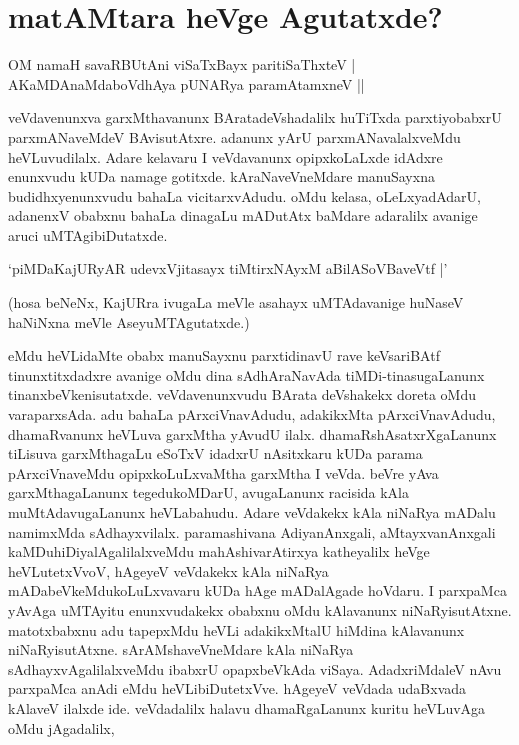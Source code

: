 \chapter{matAMtara heVge Agutatxde?}

\begin{shloka}
OM namaH savaRBUtAni viSaTxBayx paritiSaThxteV |\\
AKaMDAnaMdaboVdhAya pUNARya paramAtamxneV ||
\end{shloka}

veVdavenunxva garxMthavanunx BAratadeVshadalilx huTiTxda parxtiyobabxrU parxmANaveMdeV BAvisutAtxre. adanunx yArU parxmANavalalxveMdu heVLuvudilalx. Adare kelavaru I veVdavanunx opipxkoLaLxde idAdxre enunxvudu kUDa namage gotitxde. kAraNaveVneMdare manuSayxna budidhxyenunxvudu bahaLa vicitarxvAdudu. oMdu kelasa, oLeLxyadAdarU, adanenxV obabxnu bahaLa dinagaLu mADutAtx baMdare adaralilx avanige aruci uMTAgibiDutatxde.

\begin{shloka}
`piMDaKajURyAR udevxVjitasayx tiMtirxNAyxM aBilASoVBaveVtf |'
\end{shloka}

(hosa beNeNx, KajURra ivugaLa meVle asahayx uMTAdavanige huNaseV haNiNxna meVle AseyuMTAgutatxde.)

eMdu heVLidaMte obabx manuSayxnu parxtidinavU rave keVsariBAtf tinunxtitxdadxre avanige oMdu dina sAdhAraNavAda tiMDi-tinasugaLanunx tinanxbeVkenisutatxde. veVdavenunxvudu BArata deVshakekx doreta oMdu varaparxsAda. adu bahaLa pArxciVnavAdudu, adakikxMta pArxciVnavAdudu, dhamaRvanunx heVLuva garxMtha yAvudU ilalx. dhamaRshAsatxrXgaLanunx tiLisuva garxMthagaLu eSoTxV idadxrU nAsitxkaru kUDa parama pArxciVnaveMdu opipxkoLuLxvaMtha garxMtha I veVda. beVre yAva garxMthagaLanunx tegedukoMDarU, avugaLanunx racisida kAla muMtAdavugaLanunx heVLabahudu. Adare veVdakekx kAla niNaRya mADalu namimxMda sAdhayxvilalx. paramashivana AdiyanAnxgali, aMtayxvanAnxgali kaMDuhiDiyalAgalilalxveMdu mahAshivarAtirxya katheyalilx heVge heVLutetxVvoV, hAgeyeV veVdakekx kAla niNaRya mADabeVkeMdukoLuLxvavaru kUDa hAge mADalAgade hoVdaru. I parxpaMca yAvAga uMTAyitu enunxvudakekx obabxnu oMdu kAlavanunx niNaRyisutAtxne. matotxbabxnu adu tapepxMdu heVLi adakikxMtalU hiMdina kAlavanunx niNaRyisutAtxne. sArAMshaveVneMdare kAla niNaRya sAdhayxvAgalilalxveMdu ibabxrU opapxbeVkAda viSaya. AdadxriMdaleV nAvu parxpaMca anAdi eMdu heVLibiDutetxVve. hAgeyeV veVdada udaBxvada kAlaveV ilalxde ide. veVdadalilx halavu dhamaRgaLanunx kuritu heVLuvAga oMdu jAgadalilx, 

